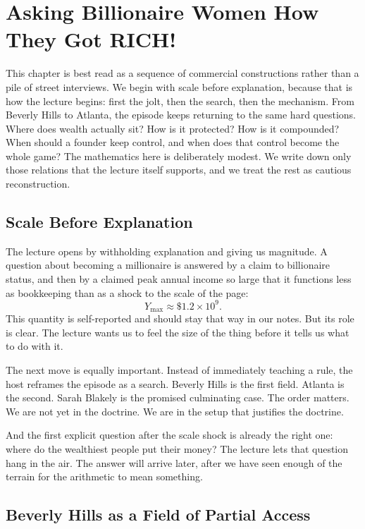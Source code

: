 \chapter{Asking Billionaire Women How They Got RICH!}

This chapter is best read as a sequence of commercial constructions rather than a pile of street interviews. We begin with scale before explanation, because that is how the lecture begins: first the jolt, then the search, then the mechanism. From Beverly Hills to Atlanta, the episode keeps returning to the same hard questions. Where does wealth actually sit? How is it protected? How is it compounded? When should a founder keep control, and when does that control become the whole game? The mathematics here is deliberately modest. We write down only those relations that the lecture itself supports, and we treat the rest as cautious reconstruction.

\section{Scale Before Explanation}

The lecture opens by withholding explanation and giving us magnitude. A question about becoming a millionaire is answered by a claim to billionaire status, and then by a claimed peak annual income so large that it functions less as bookkeeping than as a shock to the scale of the page:
\begin{equation}
Y_{\max} \approx \$1.2 \times 10^{9}.
\end{equation}
This quantity is self-reported and should stay that way in our notes. But its role is clear. The lecture wants us to feel the size of the thing before it tells us what to do with it.

The next move is equally important. Instead of immediately teaching a rule, the host reframes the episode as a search. Beverly Hills is the first field. Atlanta is the second. Sarah Blakely is the promised culminating case. The order matters. We are not yet in the doctrine. We are in the setup that justifies the doctrine.

And the first explicit question after the scale shock is already the right one: where do the wealthiest people put their money? The lecture lets that question hang in the air. The answer will arrive later, after we have seen enough of the terrain for the arithmetic to mean something.

\section{Beverly Hills as a Field of Partial Access}


